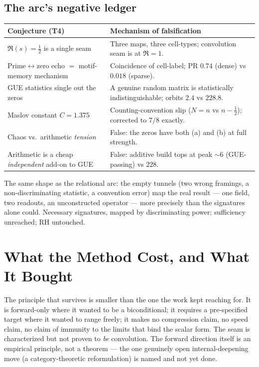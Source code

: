 \documentclass[11pt,a4paper]{article}
\newcommand{\Tf}{\textsf{T4}}
\theoremstyle{definition}
\theoremstyle{plain}
\begin{document}
\subsection{The arc's negative ledger}
\begin{longtable}{p{} p{}}
\toprule
\textbf{Conjecture (\Tf)} & \textbf{Mechanism of falsification} \\
\midrule
\endhead
$\Re(s)=\tfrac12$ is a single seam & Three maps, three cell-types; convolution seam is at $\Re=1$. \\
Prime$\leftrightarrow$zero echo $=$ motif-memory mechanism & Coincidence of cell-label; PR $0.74$ (dense) vs $0.018$ (sparse). \\
GUE statistics single out the zeros & A genuine random matrix is statistically indistinguishable; orbits $2.4$ vs $228.8$. \\
Maslov constant $C=1.375$ & Counting-convention slip ($N=n$ vs $n-\tfrac12$); corrected to $7/8$ exactly. \\
Chaos vs.\ arithmetic \emph{tension} & False: the zeros have both (a) and (b) at full strength. \\
Arithmetic is a cheap \emph{independent} add-on to GUE & False: additive build tops at peak $\sim$$6$ (GUE-passing) vs $228$. \\
\bottomrule
\end{longtable}

\noindent The same shape as the relational arc: the empty tunnels (two wrong framings, a
non-discriminating statistic, a convention error) map the real result --- one field, two readouts,
an unconstructed operator --- more precisely than the signatures alone could. Necessary signatures,
mapped by discriminating power; sufficiency unreached; RH untouched.

\section{What the Method Cost, and What It Bought}

The principle that survives is smaller than the one the work kept reaching for. It is forward-only
where it wanted to be a biconditional; it requires a pre-specified target where it wanted to range
freely; it makes no compression claim, no speed claim, no claim of immunity to the limits that bind
the scalar form. The seam is characterized but not proven to \emph{be} convolution. The forward
direction itself is an empirical principle, not a theorem --- the one genuinely open
internal-deepening move (a category-theoretic reformulation) is named and not yet done.
\end{document}
